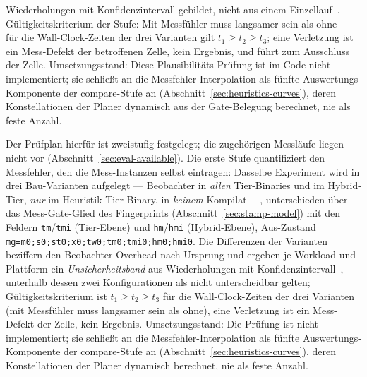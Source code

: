 \begin{nurlang}
Wiederholungen mit Konfidenzintervall gebildet, nicht aus einem Einzellauf~\cite{georges2007rigorous}.
Gültigkeitskriterium der Stufe: Mit Messfühler muss langsamer sein als ohne --- für die
Wall-Clock-Zeiten der drei Varianten gilt $t_1 \ge t_2 \ge t_3$; eine Verletzung ist ein Mess-Defekt
der betroffenen Zelle, kein Ergebnis, und führt zum Ausschluss der Zelle. Umsetzungsstand: Diese
Plausibilitäts-Prüfung ist im Code nicht implementiert; sie schließt an die Messfehler-Interpolation als
fünfte Auswertungs-Komponente der compare-Stufe an (Abschnitt~\ref{sec:heuristics-curves}), deren
Konstellationen der Planer dynamisch aus der Gate-Belegung berechnet, nie als feste Anzahl.
\end{nurlang}
\begin{nurkurz}
Der Prüfplan hierfür ist zweistufig festgelegt; die zugehörigen Messläufe liegen nicht vor
(Abschnitt~\ref{sec:eval-available}). Die erste Stufe quantifiziert den Messfehler, den die Mess-Instanzen
selbst eintragen: Dasselbe Experiment wird in drei Bau-Varianten aufgelegt ---
Beobachter in \emph{allen} Tier-Binaries und im Hybrid-Tier, \emph{nur} im Heuristik-Tier-Binary, in
\emph{keinem} Kompilat ---, unterschieden über das Mess-Gate-Glied des Fingerprints
(Abschnitt~\ref{sec:stamp-model}) mit den Feldern \texttt{tm}/\texttt{tmi} (Tier-Ebene) und
\texttt{hm}/\texttt{hmi} (Hybrid-Ebene), Aus-Zustand \texttt{mg=m0;s0;st0;x0;tw0;tm0;tmi0;hm0;hmi0}. Die
Differenzen der Varianten beziffern den Beobachter-Overhead nach Ursprung und ergeben je Workload und
Plattform ein \emph{Unsicherheitsband} aus Wiederholungen mit Konfidenzintervall~\cite{georges2007rigorous},
unterhalb dessen zwei Konfigurationen als nicht unterscheidbar gelten; Gültigkeitskriterium ist
$t_1 \ge t_2 \ge t_3$ für die Wall-Clock-Zeiten der drei Varianten (mit
Messfühler muss langsamer sein als ohne), eine Verletzung ist ein Mess-Defekt der Zelle, kein Ergebnis.
Umsetzungsstand: Die Prüfung ist nicht implementiert; sie schließt an die Messfehler-Interpolation als
fünfte Auswertungs-Komponente der compare-Stufe an (Abschnitt~\ref{sec:heuristics-curves}), deren
Konstellationen der Planer dynamisch berechnet, nie als feste Anzahl.
\end{nurkurz}

